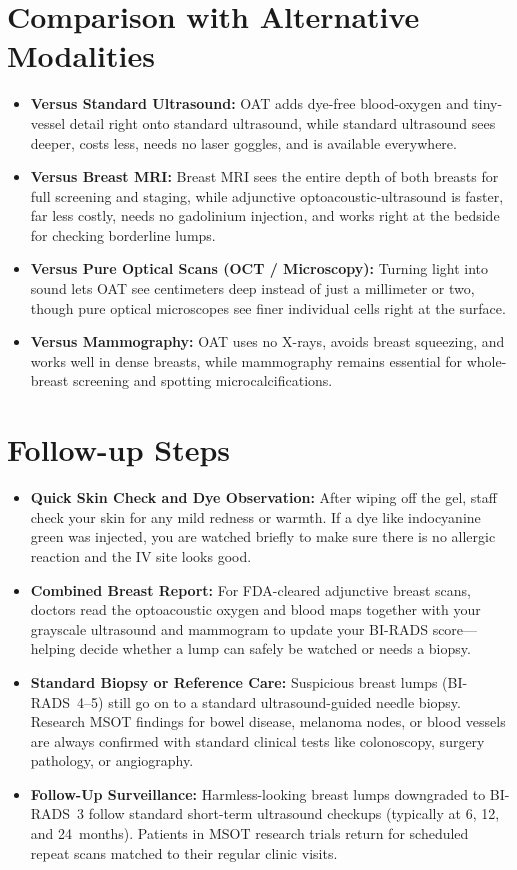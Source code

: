 \section{Comparison with Alternative Modalities}
\begin{itemize}
  \item \textbf{Versus Standard Ultrasound:} OAT adds dye-free blood-oxygen and tiny-vessel detail right onto standard ultrasound, while standard ultrasound sees deeper, costs less, needs no laser goggles, and is available everywhere.
  \item \textbf{Versus Breast MRI:} Breast MRI sees the entire depth of both breasts for full screening and staging, while adjunctive optoacoustic-ultrasound is faster, far less costly, needs no gadolinium injection, and works right at the bedside for checking borderline lumps.
  \item \textbf{Versus Pure Optical Scans (OCT / Microscopy):} Turning light into sound lets OAT see centimeters deep instead of just a millimeter or two, though pure optical microscopes see finer individual cells right at the surface.
  \item \textbf{Versus Mammography:} OAT uses no X-rays, avoids breast squeezing, and works well in dense breasts, while mammography remains essential for whole-breast screening and spotting microcalcifications.
\end{itemize}

\section{Follow-up Steps}
\begin{itemize}
  \item \textbf{Quick Skin Check and Dye Observation:} After wiping off the gel, staff check your skin for any mild redness or warmth. If a dye like indocyanine green was injected, you are watched briefly to make sure there is no allergic reaction and the IV site looks good.
  \item \textbf{Combined Breast Report:} For FDA-cleared adjunctive breast scans, doctors read the optoacoustic oxygen and blood maps together with your grayscale ultrasound and mammogram to update your BI-RADS score---helping decide whether a lump can safely be watched or needs a biopsy.
  \item \textbf{Standard Biopsy or Reference Care:} Suspicious breast lumps (BI-RADS~4--5) still go on to a standard ultrasound-guided needle biopsy. Research MSOT findings for bowel disease, melanoma nodes, or blood vessels are always confirmed with standard clinical tests like colonoscopy, surgery pathology, or angiography.
  \item \textbf{Follow-Up Surveillance:} Harmless-looking breast lumps downgraded to BI-RADS~3 follow standard short-term ultrasound checkups (typically at 6, 12, and 24~months). Patients in MSOT research trials return for scheduled repeat scans matched to their regular clinic visits.
\end{itemize}

